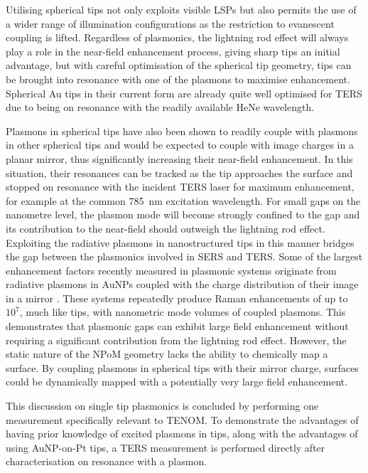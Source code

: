 \documentclass{article}
\begin{document}
Utilising spherical tips not only exploits visible LSPs but also permits the use of a wider range of illumination configurations as the restriction to evanescent coupling is lifted. Regardless of plasmonics, the lightning rod effect will always play a role in the near-field enhancement process, giving sharp tips an initial advantage, but with careful optimisation of the spherical tip geometry, tips can be brought into resonance with one of the plasmons to maximise enhancement. Spherical Au tips in their current form are already quite well optimised for TERS due to being on resonance with the readily available HeNe wavelength.

Plasmons in spherical tips have also been shown to readily couple with plasmons in other spherical tips \cite{savage2012} and would be expected to couple with image charges in a planar mirror, thus significantly increasing their near-field enhancement. In this situation, their resonances can be tracked as the tip approaches the surface and stopped on resonance with the incident TERS laser for maximum enhancement, for example at the common \SI{785}{nm} excitation wavelength. For small gaps on the nanometre level, the plasmon mode will become strongly confined to the gap and its contribution to the near-field should outweigh the lightning rod effect.
Exploiting the radiative plasmons in nanostructured tips in this manner bridges the gap between the plasmonics involved in SERS and TERS. Some of the largest enhancement factors recently measured in plasmonic systems originate from radiative plasmons in AuNPs coupled with the charge distribution of their image in a mirror \cite{mertens2013, taylor2014}. These systems repeatedly produce Raman enhancements of up to $10^7$, much like tips, with nanometric mode volumes of coupled plasmons. This demonstrates that plasmonic gaps can exhibit large field enhancement without requiring a significant contribution from the lightning rod effect. However, the static nature of the NPoM geometry lacks the ability to chemically map a surface. By coupling plasmons in spherical tips with their mirror charge, surfaces could be dynamically mapped with a potentially very large field enhancement.

This discussion on single tip plasmonics is concluded by performing one measurement specifically relevant to TENOM. To demonstrate the advantages of having prior knowledge of excited plasmons in tips, along with the advantages of using AuNP-on-Pt tips, a TERS measurement is performed directly after characterisation on resonance with a plasmon.
\end{document}
